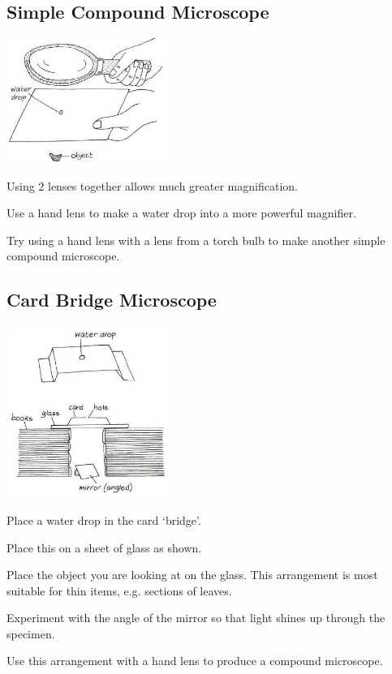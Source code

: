 \begin{multicols}{2}
\vfill

\subsection{Simple Compound Microscope}
\begin{center}
\includegraphics[width=0.4\textwidth]{./img/vso/compound-microscope.jpg}
\end{center}

\begin{itemize*}
\item Using 2 lenses together allows much greater magnification. 
\item Use a hand lens to make a water drop into a more powerful magnifier. 
\item Try using a hand lens with a lens from a torch bulb to make another simple compound microscope.
\end{itemize*}


\subsection{Card Bridge Microscope}
\begin{center}
\includegraphics[width=0.4\textwidth]{./img/vso/card-microscope.jpg}
\end{center}

\begin{itemize*}
\item Place a water drop in the card `bridge'. 
\item Place this on a sheet of glass as shown. 
\item Place the object you are looking
at on the glass. This
arrangement is most suitable
for thin items, e.g. sections of leaves. 
\item Experiment with the angle of
the mirror so that light shines
up through the specimen.
\item Use this arrangement with a
hand lens to produce a
compound microscope.
\end{itemize*}

\vfill

\end{multicols}